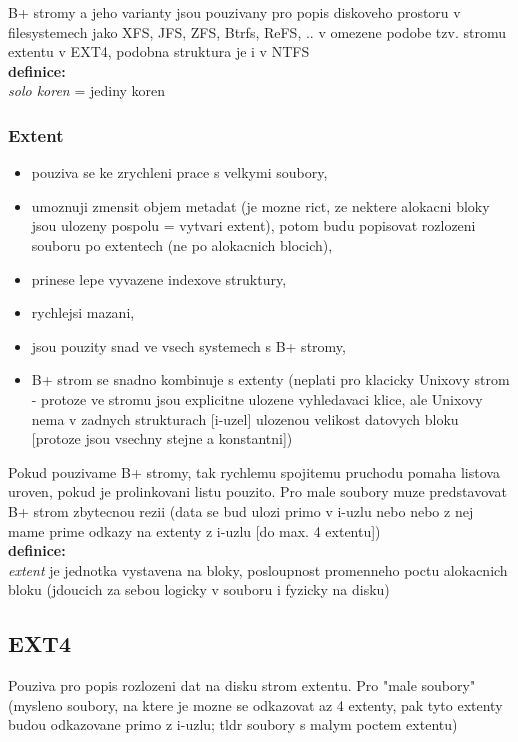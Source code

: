 \documentclass[a4paper, 11pt]{article}
\begin{document}
B+ stromy a jeho varianty jsou pouzivany pro popis diskoveho prostoru v filesystemech jako
XFS, JFS, ZFS, Btrfs, ReFS, ..
v omezene podobe tzv. stromu extentu v EXT4, podobna struktura je i v NTFS \\

\textbf{definice:} \\[0.5em]
\textit{solo koren} = jediny koren

\newpage

\subsubsection{Extent}
\begin{itemize}
    \item pouziva se ke zrychleni prace s velkymi soubory,
    \item umoznuji zmensit objem metadat (je mozne rict, ze nektere alokacni bloky jsou ulozeny pospolu = vytvari extent), potom budu popisovat rozlozeni souboru po extentech (ne po alokacnich blocich),
    \item prinese lepe vyvazene indexove struktury,
    \item rychlejsi mazani,
    \item jsou pouzity snad ve vsech systemech s B+ stromy,
    \item B+ strom se snadno kombinuje s extenty (neplati pro klacicky Unixovy strom - protoze ve stromu jsou explicitne ulozene vyhledavaci klice, ale Unixovy nema v zadnych strukturach [i-uzel] ulozenou velikost datovych bloku [protoze jsou vsechny stejne a konstantni]) \\
\end{itemize}

Pokud pouzivame B+ stromy, tak rychlemu spojitemu pruchodu pomaha listova uroven, pokud je prolinkovani listu pouzito. Pro male soubory muze predstavovat B+ strom zbytecnou rezii (data se bud ulozi primo v i-uzlu nebo nebo z nej mame prime odkazy na extenty z i-uzlu [do max. 4 extentu]) \\

\textbf{definice:} \\[0.5em]
\textit{extent} je jednotka vystavena na bloky, posloupnost promenneho poctu alokacnich bloku (jdoucich za sebou logicky v souboru i fyzicky na disku) \\

\newpage

\subsection{EXT4}
Pouziva pro popis rozlozeni dat na disku strom extentu. Pro "male soubory" (mysleno soubory, na ktere je mozne se odkazovat az 4 extenty, pak tyto extenty budou odkazovane primo z i-uzlu; tldr soubory s malym poctem extentu) \\
\end{document}
